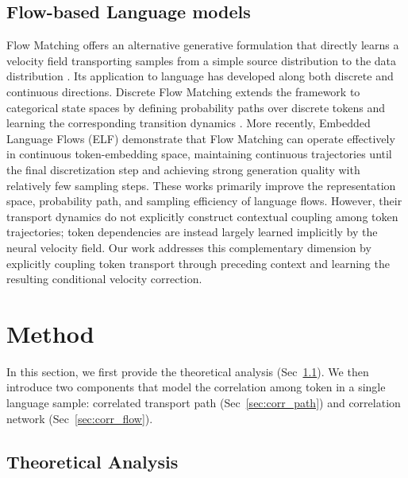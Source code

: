 \documentclass{article} %
\begin{document}
\subsection{Flow-based Language models}
Flow Matching offers an alternative generative formulation that directly learns a velocity field transporting samples from a simple source distribution to the data distribution \citep{lipman2023flow}. Its application to language has developed along both discrete and continuous directions. Discrete Flow Matching extends the framework to categorical state spaces by defining probability paths over discrete tokens and learning the corresponding transition dynamics \citep{gat2024discrete}. More recently, Embedded Language Flows (ELF) \citep{hu2026elf} demonstrate that Flow Matching can operate effectively in continuous token-embedding space, maintaining continuous trajectories until the final discretization step and achieving strong generation quality with relatively few sampling steps. These works primarily improve the representation space, probability path, and sampling efficiency of language flows. However, their transport dynamics do not explicitly construct contextual coupling among token trajectories; token dependencies are instead largely learned implicitly by the neural velocity field. Our work addresses this complementary dimension by explicitly coupling token transport through preceding context and learning the resulting conditional velocity correction.

\section{Method}
\label{sec:method}
In this section, we first provide the theoretical analysis (Sec~\ref{sec:theoretical_analysis}). We then introduce two components that model the correlation among token in a single language sample: correlated
transport path (Sec~\ref{sec:corr_path}) and correlation network (Sec~\ref{sec:corr_flow}). 

\subsection{Theoretical Analysis}
\label{sec:theoretical_analysis}
\end{document}

